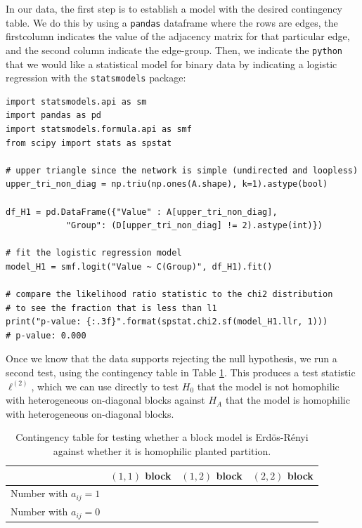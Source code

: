 In our data, the first step is to establish a model with the desired contingency table. We do this by using a \texttt{pandas} dataframe where the rows are edges, the firstcolumn indicates the value of the adjacency matrix for that particular edge, and the second column indicate the edge-group. Then, we indicate the \texttt{python} that we would like a statistical model for binary data by indicating a logistic regression with the \texttt{statsmodels} package:

\begin{lstlisting}[style=python]
import statsmodels.api as sm
import pandas as pd
import statsmodels.formula.api as smf
from scipy import stats as spstat

# upper triangle since the network is simple (undirected and loopless)
upper_tri_non_diag = np.triu(np.ones(A.shape), k=1).astype(bool)

df_H1 = pd.DataFrame({"Value" : A[upper_tri_non_diag],
            "Group": (D[upper_tri_non_diag] != 2).astype(int)})

# fit the logistic regression model
model_H1 = smf.logit("Value ~ C(Group)", df_H1).fit()

# compare the likelihood ratio statistic to the chi2 distribution
# to see the fraction that is less than l1
print("p-value: {:.3f}".format(spstat.chi2.sf(model_H1.llr, 1)))
# p-value: 0.000
\end{lstlisting}

Once we know that the data supports rejecting the null hypothesis, we run a second test, using the contingency table in Table \ref{tab:ch7:model:cont_het}. This produces a test statistic $\ell^{(2)}$, which we can use directly to test $H_0$ that the model is not homophilic with heterogeneous on-diagonal blocks against $H_A$ that the model is homophilic with heterogeneous on-diagonal blocks. 

\begin{table}[h]
    \centering
    \begin{tabular}{c|c|c|c}
         & $(1, 1)$ block & $(1, 2)$ block & $(2, 2)$ block \\
         \hline
         Number with $a_{ij} = 1$ & & & \\
         Number with $a_{ij} = 0$ & & & 
    \end{tabular}
    \caption{Contingency table for testing whether a block model is Erd\"os-R\'enyi against whether it is homophilic planted partition.}
    \label{tab:ch7:model:cont_het}
\end{table}

